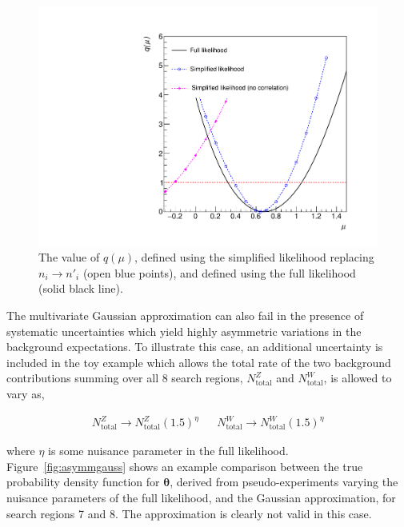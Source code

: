 \begin{figure}[hbt]
  \begin{center} 
   \includegraphics[width=1.5\cmsFigWidth]{figures/r_bias.pdf}
   \caption{The value of $q(\mu)$,  defined using the simplified likelihood replacing $n_{i}\rightarrow n'_{i}$ 
   (open blue points), and defined using the full likelihood (solid black line).}
   \label{fig:likelihoodscan_bias} 
  \end{center}
\end{figure}

The multivariate Gaussian approximation can also fail in the presence of systematic uncertainties which yield highly asymmetric 
variations in the background expectations. To illustrate this case, an additional uncertainty is included in the toy example which 
allows the total rate of the two background contributions summing over all 8 search regions, $N^{Z}_\mathrm{total}$ and $N^{W}_{\mathrm{total}}$, 
is allowed to vary as,

\begin{align}
N^{Z}_{\mathrm{total}} \rightarrow N^{Z}_{\mathrm{total}}(1.5)^{\eta} && N^{W}_{\mathrm{total}} \rightarrow N^{W}_{\mathrm{total}}(1.5)^{\eta}
\label{eq:meh}
\end{align}

where $\eta$ is some nuisance parameter in the full likelihood. Figure~\ref{fig:asymmgauss} shows an example comparison between the 
true probability density function for $\boldsymbol{\theta}$, derived from pseudo-experiments varying the nuisance parameters  
of the full likelihood, and the Gaussian approximation, for search regions 7 and 8. The approximation is clearly not valid in this case. 

